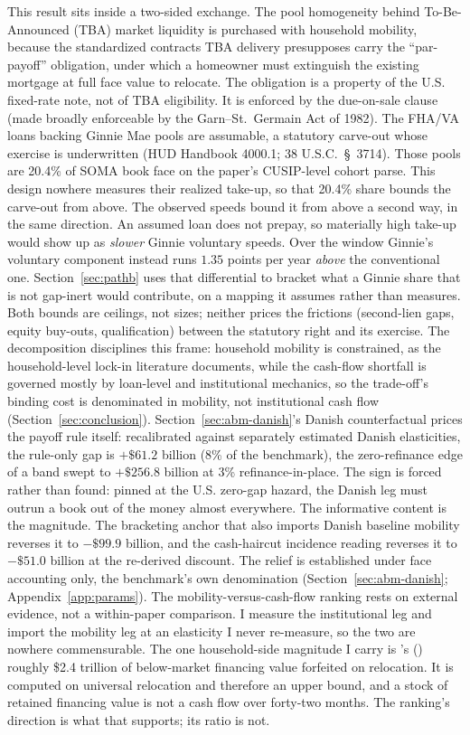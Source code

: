 \documentclass[12pt]{article}
\newcommand{\citepos}[1]{\citeauthor{#1}'s (\citeyear{#1})}
\begin{document}
This result sits inside a two-sided exchange. The pool homogeneity behind To-Be-Announced (TBA) market liquidity \citep[the market's institutional design is reviewed in][]{fuster2023} is purchased with household mobility, because the standardized contracts TBA delivery presupposes carry the ``par-payoff'' obligation, under which a homeowner must extinguish the existing mortgage at full face value to relocate. The obligation is a property of the U.S. fixed-rate note, not of TBA eligibility. It is enforced by the due-on-sale clause (made broadly enforceable by the Garn--St.~Germain Act of 1982). The FHA/VA loans backing Ginnie Mae pools are assumable, a statutory carve-out whose exercise is underwritten (HUD Handbook 4000.1; 38 U.S.C.~\S~3714). Those pools are 20.4\% of SOMA book face on the paper's CUSIP-level cohort parse. This design nowhere measures their realized take-up, so that 20.4\% share bounds the carve-out from above. The observed speeds bound it from above a second way, in the same direction. An assumed loan does not prepay, so materially high take-up would show up as \emph{slower} Ginnie voluntary speeds. Over the window Ginnie's voluntary component instead runs $1.35$ points per year \emph{above} the conventional one. Section~\ref{sec:pathb} uses that differential to bracket what a Ginnie share that is not gap-inert would contribute, on a mapping it assumes rather than measures. Both bounds are ceilings, not sizes; neither prices the frictions (second-lien gaps, equity buy-outs, qualification) between the statutory right and its exercise. The decomposition disciplines this frame: household mobility is constrained, as the household-level lock-in literature documents, while the cash-flow shortfall is governed mostly by loan-level and institutional mechanics, so the trade-off's binding cost is denominated in mobility, not institutional cash flow (Section~\ref{sec:conclusion}). Section~\ref{sec:abm-danish}'s Danish counterfactual prices the payoff rule itself: recalibrated against separately estimated Danish elasticities, the rule-only gap is $+\$61.2$ billion (8\% of the benchmark), the zero-refinance edge of a band swept to $+\$256.8$ billion at 3\% refinance-in-place. The sign is forced rather than found: pinned at the U.S. zero-gap hazard, the Danish leg must outrun a book out of the money almost everywhere. The informative content is the magnitude. The bracketing anchor that also imports Danish baseline mobility reverses it to $-\$99.9$ billion, and the cash-haircut incidence reading reverses it to $-\$51.0$ billion at the re-derived discount. The relief is established under face accounting only, the benchmark's own denomination (Section~\ref{sec:abm-danish}; Appendix~\ref{app:params}). The mobility-versus-cash-flow ranking rests on external evidence, not a within-paper comparison. I measure the institutional leg and import the mobility leg at an elasticity I never re-measure, so the two are nowhere commensurable. The one household-side magnitude I carry is \citepos{batzer2024} roughly \$2.4 trillion of below-market financing value forfeited on relocation. It is computed on universal relocation and therefore an upper bound, and a stock of retained financing value is not a cash flow over forty-two months. The ranking's direction is what that supports; its ratio is not.
\end{document}

